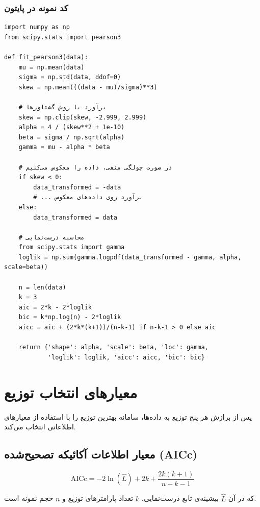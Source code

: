 \documentclass[a4paper,12pt]{article}
\begin{document}
\subsubsection{کد نمونه در پایتون}

\begin{verbatim}
import numpy as np
from scipy.stats import pearson3

def fit_pearson3(data):
    mu = np.mean(data)
    sigma = np.std(data, ddof=0)
    skew = np.mean(((data - mu)/sigma)**3)
    
    # برآورد با روش گشتاورها
    skew = np.clip(skew, -2.999, 2.999)
    alpha = 4 / (skew**2 + 1e-10)
    beta = sigma / np.sqrt(alpha)
    gamma = mu - alpha * beta
    
    # در صورت چولگی منفی، داده را معکوس می‌کنیم
    if skew < 0:
        data_transformed = -data
        # ... برآورد روی داده‌های معکوس
    else:
        data_transformed = data
    
    # محاسبه درست‌نمایی
    from scipy.stats import gamma
    loglik = np.sum(gamma.logpdf(data_transformed - gamma, alpha, scale=beta))
    
    n = len(data)
    k = 3
    aic = 2*k - 2*loglik
    bic = k*np.log(n) - 2*loglik
    aicc = aic + (2*k*(k+1))/(n-k-1) if n-k-1 > 0 else aic
    
    return {'shape': alpha, 'scale': beta, 'loc': gamma,
            'loglik': loglik, 'aicc': aicc, 'bic': bic}
\end{verbatim}

\section{معیارهای انتخاب توزیع}

پس از برازش هر پنج توزیع به داده‌ها، سامانه بهترین توزیع را با استفاده از معیارهای اطلاعاتی انتخاب می‌کند.

\subsection{معیار اطلاعات آکائیکه تصحیح‌شده (AICc)}

\begin{equation}
\text{AICc} = -2\ln(\hat{L}) + 2k + \frac{2k(k+1)}{n-k-1}
\end{equation}

که در آن $\hat{L}$ بیشینه‌ی تابع درست‌نمایی، $k$ تعداد پارامترهای توزیع و $n$ حجم نمونه است.
\end{document}
